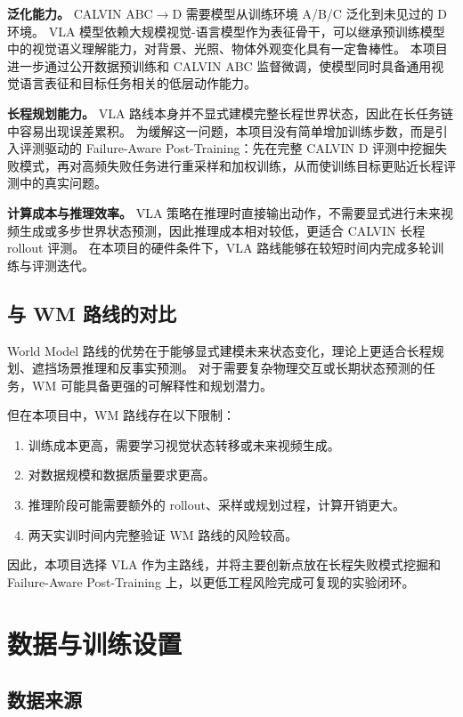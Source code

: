 \documentclass[10pt,a4paper,fontset=none]{ctexart}
\begin{document}
\textbf{泛化能力。}
CALVIN ABC$\rightarrow$D 需要模型从训练环境 A/B/C 泛化到未见过的 D 环境。
VLA 模型依赖大规模视觉-语言模型作为表征骨干，可以继承预训练模型中的视觉语义理解能力，对背景、光照、物体外观变化具有一定鲁棒性。
本项目进一步通过公开数据预训练和 CALVIN ABC 监督微调，使模型同时具备通用视觉语言表征和目标任务相关的低层动作能力。

\textbf{长程规划能力。}
VLA 路线本身并不显式建模完整长程世界状态，因此在长任务链中容易出现误差累积。
为缓解这一问题，本项目没有简单增加训练步数，而是引入评测驱动的 Failure-Aware Post-Training：先在完整 CALVIN D 评测中挖掘失败模式，再对高频失败任务进行重采样和加权训练，从而使训练目标更贴近长程评测中的真实问题。

\textbf{计算成本与推理效率。}
VLA 策略在推理时直接输出动作，不需要显式进行未来视频生成或多步世界状态预测，因此推理成本相对较低，更适合 CALVIN 长程 rollout 评测。
在本项目的硬件条件下，VLA 路线能够在较短时间内完成多轮训练与评测迭代。

\subsection{与 WM 路线的对比}

World Model 路线的优势在于能够显式建模未来状态变化，理论上更适合长程规划、遮挡场景推理和反事实预测。
对于需要复杂物理交互或长期状态预测的任务，WM 可能具备更强的可解释性和规划潜力。

但在本项目中，WM 路线存在以下限制：

\begin{enumerate}
  \item 训练成本更高，需要学习视觉状态转移或未来视频生成。
  \item 对数据规模和数据质量要求更高。
  \item 推理阶段可能需要额外的 rollout、采样或规划过程，计算开销更大。
  \item 两天实训时间内完整验证 WM 路线的风险较高。
\end{enumerate}

因此，本项目选择 VLA 作为主路线，并将主要创新点放在长程失败模式挖掘和 Failure-Aware Post-Training 上，以更低工程风险完成可复现的实验闭环。

\section{数据与训练设置}

\subsection{数据来源}
\end{document}
